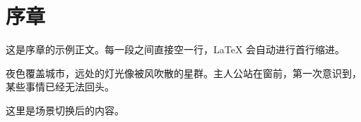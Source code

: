 \chapter*{序章}

这是序章的示例正文。每一段之间直接空一行，LaTeX 会自动进行首行缩进。

夜色覆盖城市，远处的灯光像被风吹散的星群。主人公站在窗前，第一次意识到，某些事情已经无法回头。

\SceneBreak

这里是场景切换后的内容。
